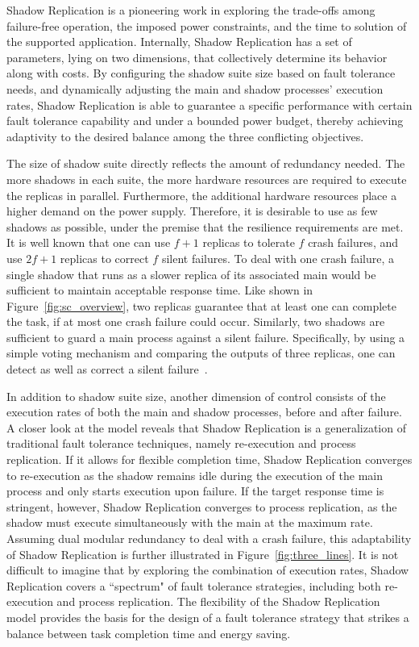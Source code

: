 Shadow Replication is a pioneering work in exploring the trade-offs among failure-free operation, the imposed power constraints, and the time to solution of the supported application. 
Internally, Shadow Replication has a set of parameters,    lying on two dimensions, that collectively determine its behavior along with costs. By configuring the shadow suite size based on fault tolerance needs, and dynamically adjusting the main and shadow processes' execution rates, Shadow Replication is able to guarantee a specific performance with certain fault tolerance capability and under a bounded power budget, thereby achieving adaptivity to the desired balance among the three conflicting objectives. 

The size of shadow suite directly reflects the amount of redundancy needed. The more shadows in each suite, the more hardware resources are required to execute the replicas in parallel. Furthermore, the additional hardware resources place a higher demand on the power supply. Therefore, it is desirable to use as few shadows as possible, under the premise that the resilience requirements are met. It is well known that one can use $f+1$ replicas to tolerate $f$ crash failures, and use $2f+1$ replicas to correct $f$ silent failures. To deal with one crash failure, a single shadow that runs as a slower replica of its associated main would be sufficient to maintain acceptable response time. Like shown in Figure~\ref{fig:sc_overview}, two replicas guarantee that at least one can complete the task, if at most one crash failure could occur. Similarly, two shadows are sufficient to guard a main process against a silent failure. Specifically, by using a simple voting mechanism and comparing the outputs of three replicas, one can detect as well as correct a silent failure~\cite{fiala_2012_sdc}. 

In addition to shadow suite size, another dimension of control consists of the execution rates of both the main and shadow processes, before and after failure. 
A closer look at the model reveals that Shadow
Replication is a generalization of traditional fault tolerance
techniques, namely re-execution and process replication. If it allows for flexible completion time, 
Shadow Replication converges to re-execution as
the shadow remains idle during the execution of the main process and
only starts execution upon failure. If the target response time is
stringent, however, Shadow Replication converges to process replication,
as the shadow must execute simultaneously with the main at the maximum
rate. Assuming dual modular redundancy to deal with a crash failure, this adaptability of Shadow Replication is further illustrated in Figure~\ref{fig:three_lines}. 
It is not difficult to imagine that by exploring the combination of execution rates, Shadow Replication covers a ``spectrum" of fault tolerance strategies, including both re-execution and process replication. 
The flexibility of the Shadow Replication model provides the
basis for the design of a fault tolerance strategy that strikes a balance between task completion time and energy saving. 

